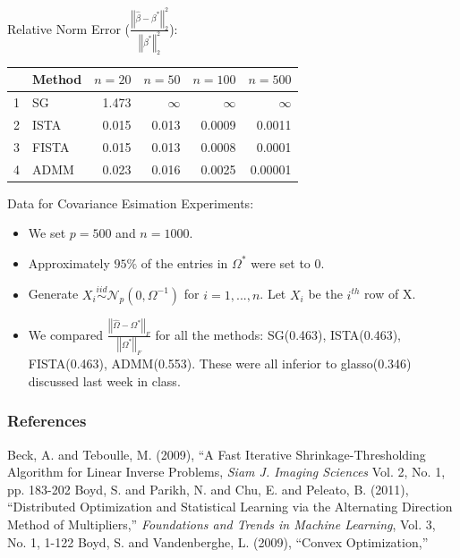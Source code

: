 \documentclass[xcolor=dvipsnames,aspectratio=1610]{beamer}
\newcommand{\norm}[1]{\left|\left|#1\right|\right|}
\theoremstyle{remark}
\begin{document}
\begin{frame}{Relative Norm Error ($\frac{\norm{\hat{\beta}-\beta^*}_2^2}{\norm{\beta^*}_2^2}$):}
\begin{table}[ht]
\centering
\begin{tabular}{rlrrrr}
  \hline
 & Method & $n=20$ & $n=50$ & $n=100$ & $n=500$ \\ 
  \hline
1 & SG & 1.473 & $\infty$ & $\infty$ & $\infty$\\ 
  2 & ISTA& 0.015 & 0.013 & 0.0009 & 0.0011\\ 
  3 & FISTA & 0.015& 0.013 & 0.0008 & 0.0001\\ 
  4 & ADMM & 0.023 & 0.016 & 0.0025 & 0.00001\\ 
   \hline
\end{tabular}
\label{tab:relnorm}
\end{table}
\end{frame}

\begin{frame}{Data for Covariance Esimation Experiments:}
  \begin{itemize}
    \setlength{\itemsep}{10pt}
\item We set $p = 500$ and $n = 1000$.
\item Approximately $95\%$ of the entries in $\Omega^*$ were set to 0. 
\item Generate $X_i \overset{iid}{\sim} \mathcal{N}_p(0, \Omega^{-1})$ for $i = 1,...,n$. Let $X_i$ be the $i^{th}$ row of X.
 \item We compared  $\frac{\norm{\hat{\Omega}-\Omega^*}_F}{\norm{\Omega^*}_F}$ for all the methods: SG(0.463), ISTA(0.463), FISTA(0.463), ADMM(0.553). These were all inferior to glasso(0.346) discussed last week in class.
  \end{itemize}
\end{frame}

\begin{frame}
\frametitle{References}
\small
\begin{block}{}
\begin{thebibliography}{Tototo}
 Beck, A. and Teboulle, M. (2009), {``A Fast Iterative Shrinkage-Thresholding Algorithm
for Linear Inverse Problems}, \emph{Siam J. Imaging Sciences} Vol. 2, No. 1, pp. 183-202
 Boyd, S. and Parikh, N. and Chu, E. and Peleato, B.  (2011), {``Distributed Optimization and Statistical Learning via the Alternating Direction Method of Multipliers,''} \emph{Foundations and Trends in
Machine Learning}, Vol. 3, No. 1, 1-122
  Boyd, S. and Vandenberghe, L. (2009), {``Convex Optimization,''} 
\end{thebibliography}
\end{block}
\end{frame}
\end{document}
